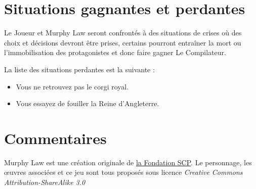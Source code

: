 \section{Situations gagnantes et perdantes}

Le Joueur et Murphy Law seront confrontés à des situations de crises où des choix et décisions devront être prises, certains pourront entraîner la mort ou l'immobilisation des protagonistes et donc faire gagner Le Compilateur.

La liste des situations perdantes est la suivante :

\begin{description}[align=left,leftmargin=!,labelwidth=\widthof{\bfseries A Buckingham Palace}]
  \item [A Buckingham Palace] \begin{itemize}
    \item Vous ne retrouvez pas le corgi royal.
    \item Vous essayez de fouiller la Reine d'Angleterre.
  \end{itemize}
\end{description}

\section{Commentaires}

Murphy Law est une création originale de \href{http://scp-wiki.wikidot.com/murphy-law-hub}{la Fondation SCP}. Le personnage, les œuvres associées et ce jeu sont tous proposés sous licence \emph{Creative Commons Attribution-ShareAlike 3.0}
 
